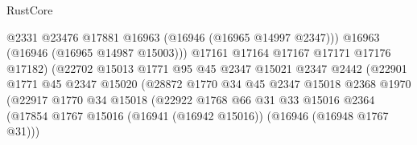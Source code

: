 \begin{lexlean}{RustCore}
\begin{coremodule}
                                            @2331
                                            @23476
                                            @17881
                                            @16963
                                            (@16946 (@16965 @14997 @2347)))
                                          @16963
                                          (@16946 (@16965 @14987 @15003)))
                                        @17161
                                        @17164
                                        @17167
                                        @17171
                                        @17176
                                        @17182)
                                      (@22702
                                        @15013
                                        @1771
                                        @95
                                        @45
                                        @2347
                                        @15021
                                        @2347
                                        @2442
                                        (@22901
                                          @1771
                                          @45
                                          @2347
                                          @15020
                                          (@28872
                                            @1770
                                            @34
                                            @45
                                            @2347
                                            @15018
                                            @2368
                                            @1970
                                            (@22917
                                              @1770
                                              @34
                                              @15018
                                              (@22922
                                                @1768
                                                @66
                                                @31
                                                @33
                                                @15016
                                                @2364
                                                (@17854
                                                  @1767
                                                  @15016
                                                  (@16941 (@16942 @15016))
                                                  (@16946 (@16948 @1767 @31)))

\end{coremodule}
\end{lexlean}
